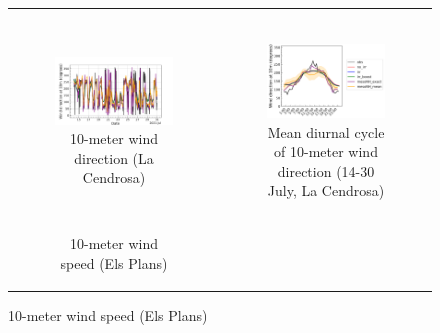 \begin{figure}[t]
\begin{tabular}{cc}
\begin{subfigure}[t]{0.5\textwidth}
        \end{subfigure} \\
        \begin{subfigure}[t]{0.5\textwidth}
            \caption{10-meter wind direction (La Cendrosa)}
            \includegraphics[width=\textwidth]{images/chap5/SOP_TS_DC/time_series_cendrosa_wind_direction_10m.png}
        \end{subfigure} &
        \begin{subfigure}[t]{0.5\textwidth}
            \caption{Mean diurnal cycle of 10-meter wind direction (14-30 July, La Cendrosa)}
            \includegraphics[width=\textwidth]{images/chap5/SOP_TS_DC/diurnal_cycle_cendrosa_wind_direction_10m.png}
        \end{subfigure} \\
        \begin{subfigure}[t]{0.5\textwidth}
            \caption{10-meter wind speed (Els Plans)}

\end{subfigure}
\end{tabular}
\end{figure}
